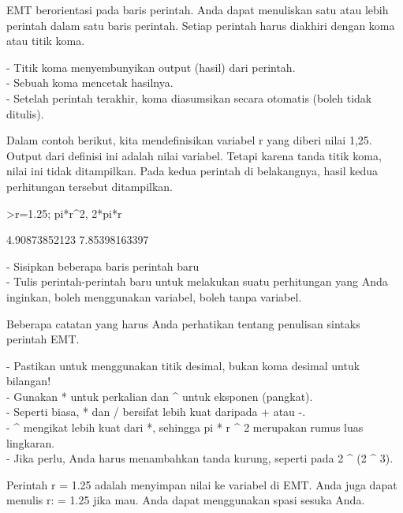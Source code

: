 \documentclass[a4paper,10pt]{article}
\begin{document}
\begin{eulernotebook}
\begin{eulercomment}
\begin{eulercomment}
\begin{eulercomment}
EMT berorientasi pada baris perintah. Anda dapat menuliskan satu atau lebih
perintah dalam satu baris perintah. Setiap perintah harus diakhiri dengan koma
atau titik koma.

- Titik koma menyembunyikan output (hasil) dari perintah.\\
- Sebuah koma mencetak hasilnya.\\
- Setelah perintah terakhir, koma diasumsikan secara otomatis (boleh tidak
ditulis).

Dalam contoh berikut, kita mendefinisikan variabel r yang diberi nilai 1,25.
Output dari definisi ini adalah nilai variabel. Tetapi karena tanda titik koma,
nilai ini tidak ditampilkan. Pada kedua perintah di belakangnya, hasil kedua
perhitungan tersebut ditampilkan.
\end{eulercomment}
\begin{eulerprompt}
>r=1.25; pi*r^2, 2*pi*r
\end{eulerprompt}
\begin{euleroutput}
  4.90873852123
  7.85398163397
\end{euleroutput}
\begin{eulercomment}
- Sisipkan beberapa baris perintah baru\\
- Tulis perintah-perintah baru untuk melakukan suatu perhitungan yang Anda
inginkan, boleh menggunakan variabel, boleh tanpa variabel.\\
\end{eulercomment}
\eulersubheading{}
\begin{eulercomment}
Beberapa catatan yang harus Anda perhatikan tentang penulisan sintaks perintah
EMT.

- Pastikan untuk menggunakan titik desimal, bukan koma desimal untuk bilangan!\\
- Gunakan * untuk perkalian dan \textasciicircum{} untuk eksponen (pangkat).\\
- Seperti biasa, * dan / bersifat lebih kuat daripada + atau -.\\
- \textasciicircum{} mengikat lebih kuat dari *, sehingga pi * r \textasciicircum{} 2 merupakan rumus luas
lingkaran.\\
- Jika perlu, Anda harus menambahkan tanda kurung, seperti pada 2 \textasciicircum{} (2 \textasciicircum{} 3).

Perintah r = 1.25 adalah menyimpan nilai ke variabel di EMT. Anda juga dapat
menulis r: = 1.25 jika mau. Anda dapat menggunakan spasi sesuka Anda.


\end{eulercomment}
\end{eulercomment}
\end{eulercomment}
\end{eulernotebook}
\end{document}
